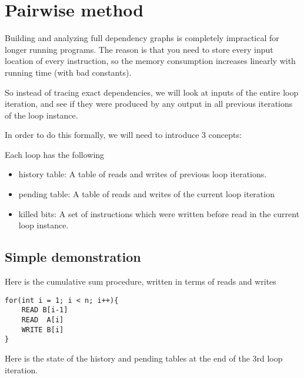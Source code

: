\documentclass[12pt,twoside]{reedthesis}
\begin{document}
		
	\section{Pairwise method}
		 
		Building and analyzing full dependency graphs is completely impractical for longer running programs. The reason is that you need to store every input location of every instruction, so the memory consumption increases linearly with running time (with bad constants). 
		
		So instead of tracing exact dependencies, we will look at inputs of the entire loop iteration, and see if they were produced by any output in all previous iterations of the loop instance. 
		
		In order to do this formally, we will need to introduce 3 concepts:
		
		Each loop has the following
		\begin{itemize}
			\item history table: A table of reads and writes of previous loop iterations.
			\item pending table: A table of reads and writes of the current loop iteration
			\item killed bits: A set of instructions which were written before read in the current loop instance. 
		\end{itemize}
		
		\subsection{Simple demonstration}
		
		Here is the cumulative sum procedure, written in terms of reads and writes
		
		\begin{lstlisting}
for(int i = 1; i < n; i++){
	READ B[i-1]
	READ  A[i]
	WRITE B[i]
}
		\end{lstlisting}
		
		Here is the state of the history and pending tables at the end of the 3rd loop iteration. 
		
\end{document}
